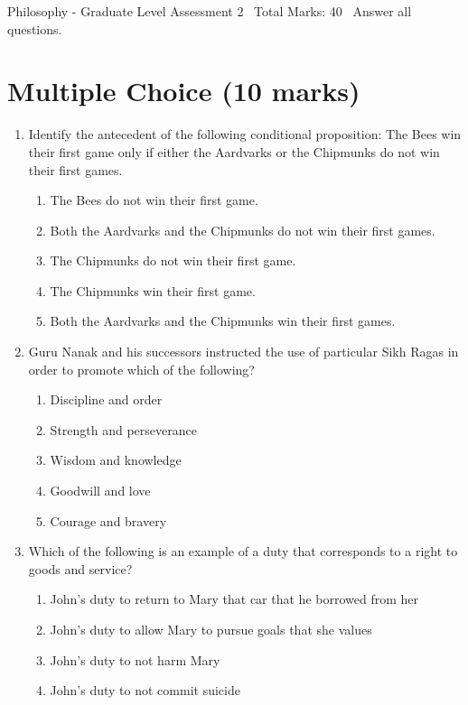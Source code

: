 \documentclass[12pt]{article}
\begin{document}
\begin{center}
Philosophy - Graduate Level Assessment 2 \
Total Marks: 40 \
Answer all questions.
\end{center}

\section*{Multiple Choice (10 marks)}
\begin{enumerate}[label=\arabic*.]
\item Identify the antecedent of the following conditional proposition: The Bees win their first game only if either the Aardvarks or the Chipmunks do not win their first games.
\begin{enumerate}[label=(\alph*)]
    \item The Bees do not win their first game.
    \item Both the Aardvarks and the Chipmunks do not win their first games.
    \item The Chipmunks do not win their first game.
    \item The Chipmunks win their first game.
    \item Both the Aardvarks and the Chipmunks win their first games.
\end{enumerate}
\item Guru Nanak and his successors instructed the use of particular Sikh Ragas in order to promote which of the following?
\begin{enumerate}[label=(\alph*)]
    \item Discipline and order
    \item Strength and perseverance
    \item Wisdom and knowledge
    \item Goodwill and love
    \item Courage and bravery
\end{enumerate}
\item Which of the following is an example of a duty that corresponds to a right to goods and service?
\begin{enumerate}[label=(\alph*)]
    \item John's duty to return to Mary that car that he borrowed from her
    \item John's duty to allow Mary to pursue goals that she values
    \item John's duty to not harm Mary
    \item John's duty to not commit suicide

\end{enumerate}
\end{enumerate}
\end{document}
